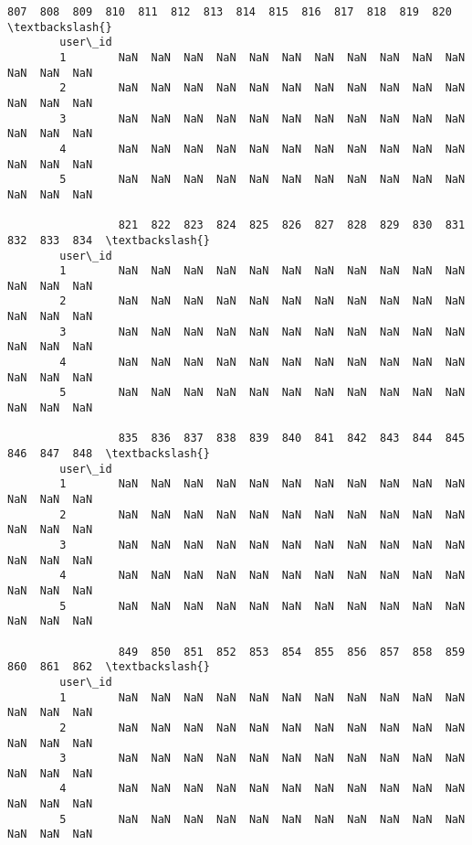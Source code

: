 \documentclass[11pt]{article}
\begin{document}
\begin{Verbatim}[commandchars=\\\{\}]
                 807  808  809  810  811  812  813  814  815  816  817  818  819  820  \textbackslash{}
        user\_id                                                                         
        1        NaN  NaN  NaN  NaN  NaN  NaN  NaN  NaN  NaN  NaN  NaN  NaN  NaN  NaN   
        2        NaN  NaN  NaN  NaN  NaN  NaN  NaN  NaN  NaN  NaN  NaN  NaN  NaN  NaN   
        3        NaN  NaN  NaN  NaN  NaN  NaN  NaN  NaN  NaN  NaN  NaN  NaN  NaN  NaN   
        4        NaN  NaN  NaN  NaN  NaN  NaN  NaN  NaN  NaN  NaN  NaN  NaN  NaN  NaN   
        5        NaN  NaN  NaN  NaN  NaN  NaN  NaN  NaN  NaN  NaN  NaN  NaN  NaN  NaN   
        
                 821  822  823  824  825  826  827  828  829  830  831  832  833  834  \textbackslash{}
        user\_id                                                                         
        1        NaN  NaN  NaN  NaN  NaN  NaN  NaN  NaN  NaN  NaN  NaN  NaN  NaN  NaN   
        2        NaN  NaN  NaN  NaN  NaN  NaN  NaN  NaN  NaN  NaN  NaN  NaN  NaN  NaN   
        3        NaN  NaN  NaN  NaN  NaN  NaN  NaN  NaN  NaN  NaN  NaN  NaN  NaN  NaN   
        4        NaN  NaN  NaN  NaN  NaN  NaN  NaN  NaN  NaN  NaN  NaN  NaN  NaN  NaN   
        5        NaN  NaN  NaN  NaN  NaN  NaN  NaN  NaN  NaN  NaN  NaN  NaN  NaN  NaN   
        
                 835  836  837  838  839  840  841  842  843  844  845  846  847  848  \textbackslash{}
        user\_id                                                                         
        1        NaN  NaN  NaN  NaN  NaN  NaN  NaN  NaN  NaN  NaN  NaN  NaN  NaN  NaN   
        2        NaN  NaN  NaN  NaN  NaN  NaN  NaN  NaN  NaN  NaN  NaN  NaN  NaN  NaN   
        3        NaN  NaN  NaN  NaN  NaN  NaN  NaN  NaN  NaN  NaN  NaN  NaN  NaN  NaN   
        4        NaN  NaN  NaN  NaN  NaN  NaN  NaN  NaN  NaN  NaN  NaN  NaN  NaN  NaN   
        5        NaN  NaN  NaN  NaN  NaN  NaN  NaN  NaN  NaN  NaN  NaN  NaN  NaN  NaN   
        
                 849  850  851  852  853  854  855  856  857  858  859  860  861  862  \textbackslash{}
        user\_id                                                                         
        1        NaN  NaN  NaN  NaN  NaN  NaN  NaN  NaN  NaN  NaN  NaN  NaN  NaN  NaN   
        2        NaN  NaN  NaN  NaN  NaN  NaN  NaN  NaN  NaN  NaN  NaN  NaN  NaN  NaN   
        3        NaN  NaN  NaN  NaN  NaN  NaN  NaN  NaN  NaN  NaN  NaN  NaN  NaN  NaN   
        4        NaN  NaN  NaN  NaN  NaN  NaN  NaN  NaN  NaN  NaN  NaN  NaN  NaN  NaN   
        5        NaN  NaN  NaN  NaN  NaN  NaN  NaN  NaN  NaN  NaN  NaN  NaN  NaN  NaN   
        

\end{Verbatim}
\end{document}

